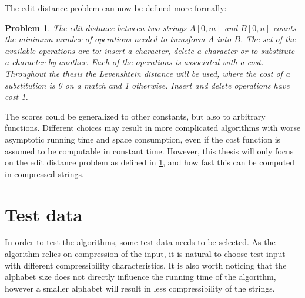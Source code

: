\documentclass[twoside,11pt,openright]{report}
\newcommand{\str}[3]{#1[#2, #3]}
\newtheorem{problem}{Problem}
\begin{document}
The edit distance problem can now be defined more formally:
\begin{problem}
  \label{problem:edit-distance}
  The edit distance between two strings $\str{A}{0}{m}$ and $\str{B}{0}{n}$ counts the minimum number of operations needed to transform $A$ into $B$. The set of the available operations are to: insert a character, delete a character or to substitute a character by another. Each of the operations is associated with a cost. Throughout the thesis the Levenshtein distance will be used, where the cost of a substitution is 0 on a match and 1 otherwise. Insert and delete operations have cost 1.
\end{problem}
The scores could be generalized to other constants, but also to arbitrary functions. Different choices may result in more complicated algorithms with worse asymptotic running time and space consumption, even if the cost function is assumed to be computable in constant time. However, this thesis will only focus on the edit distance problem as defined in \cref{problem:edit-distance}, and how fast this can be computed in compressed strings.

\section{Test data}
\label{sec:intro:test-data}
In order to test the algorithms, some test data needs to be selected. As the algorithm relies on compression of the input, it is natural to choose test input with different compressibility characteristics. It is also worth noticing that the alphabet size does not directly influence the running time of the algorithm, however a smaller alphabet will result in less compressibility of the strings.
\end{document}

